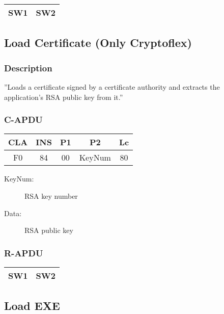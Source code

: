 \documentclass[a4paper,oneside]{article}
\begin{document}
\begin{tabular}{|c|c|} \hline
SW1 & SW2 \\ \hline
\end{tabular}


\subsection{Load Certificate (Only Cryptoflex)}

\subsubsection*{Description}

''Loads a certificate signed by a certificate authority and extracts
the application's RSA public key from it.''

\subsubsection*{C-APDU}

\begin{tabular}{|c|c|c|c|c|} \hline
CLA & INS & P1 & P2 & Lc \\ \hline \hline
F0 & 84 & 00 & KeyNum & 80 \\ \hline
\end{tabular}

\begin{description}
\item[KeyNum:] RSA key number
\item[Data:] RSA public key
\end{description}

\subsubsection*{R-APDU}

\begin{tabular}{|c|c|} \hline
SW1 & SW2 \\ \hline
\end{tabular}


\subsection{Load EXE}
\end{document}

